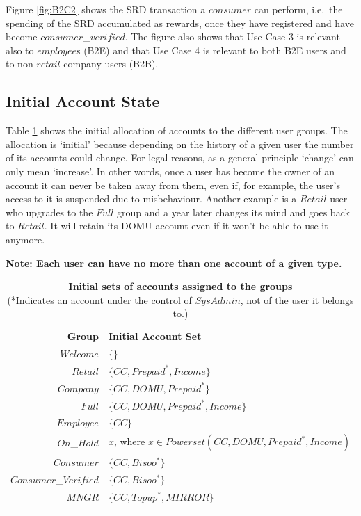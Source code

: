 Figure \ref{fig:B2C2} shows the SRD transaction a $consumer$ can perform, i.e.\ the spending of the SRD accumulated as rewards, once they have registered and have become $consumer$\_$verified$. The figure also shows that Use Case 3 is relevant also to $employee$s (B2E) and that Use Case 4 is relevant to both B2E users and to non-$retail$ company users (B2B).

\subsection{Initial Account State}
Table \ref{tab:InitialAccountSets} shows the initial allocation of accounts to the different user groups. The allocation is `initial' because  depending on the history of a given user the number of its accounts could change. For legal reasons, as a general principle `change' can only mean `increase'. In other words, once a user has become the owner of an account it can never be taken away from them, even if, for example, the user's access to it is suspended due to misbehaviour. Another example is a $Retail$ user who upgrades to the $Full$ group and a year later changes its mind and goes back to $Retail$. It will retain its DOMU account even if it won't be able to use it anymore.

{\bf Note: Each user can have no more than one account of a given type.}

\begin{table}[h]
\vspace{-0.5cm}
\begin{centering}
\small
{
\begin{tabular}{ r | l  }
\hline
\textbf{Group}	& {\bf Initial Account Set} \\
\Xhline{1.5pt}
$Welcome$	& $\{ \}$ \\
\hline
$Retail$		& $\{ CC, Prepaid^*, Income \}$ \\
\hline
$Company$	& $\{ CC, DOMU, Prepaid^* \}$ \\
\hline
$Full$		& $\{ CC, DOMU, Prepaid^*, Income \}$ \\
\hline
$Employee$	& $\{ CC \}$ \\
\hline
$On$\_$Hold$	& $x$, where $x \in Powerset(CC, DOMU, Prepaid^*, Income)$ \\
\hline
$Consumer$	& $\{ CC, Bisoo^* \}$ \\
\hline
$Consumer$\_$Verified$ & $\{ CC, Bisoo^* \}$ \\
\hline
$MNGR$ 		& $\{ CC, Topup^*, MIRROR \}$ \\
\Xhline{1.5pt}
\end{tabular}
}
\caption{\small\textbf{Initial sets of accounts assigned to the groups}\\ (*Indicates an account under the control of $SysAdmin$, not of the user it belongs to.)}
\label{tab:InitialAccountSets}
\end{centering}
\vspace{-1cm}
\end{table}

